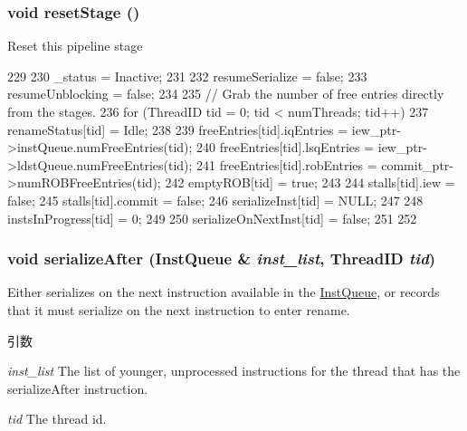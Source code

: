 \hypertarget{classDefaultRename_ada2a699094bc420f977abf2a17ed14c8}{
\subsubsection[{resetStage}]{\setlength{\rightskip}{0pt plus 5cm}void resetStage ()}}
\label{classDefaultRename_ada2a699094bc420f977abf2a17ed14c8}
Reset this pipeline stage 


\begin{DoxyCode}
229 {
230     _status = Inactive;
231 
232     resumeSerialize = false;
233     resumeUnblocking = false;
234 
235     // Grab the number of free entries directly from the stages.
236     for (ThreadID tid = 0; tid < numThreads; tid++) {
237         renameStatus[tid] = Idle;
238 
239         freeEntries[tid].iqEntries = iew_ptr->instQueue.numFreeEntries(tid);
240         freeEntries[tid].lsqEntries = iew_ptr->ldstQueue.numFreeEntries(tid);
241         freeEntries[tid].robEntries = commit_ptr->numROBFreeEntries(tid);
242         emptyROB[tid] = true;
243 
244         stalls[tid].iew = false;
245         stalls[tid].commit = false;
246         serializeInst[tid] = NULL;
247 
248         instsInProgress[tid] = 0;
249 
250         serializeOnNextInst[tid] = false;
251     }
252 }
\end{DoxyCode}
\hypertarget{classDefaultRename_a4010b268c107b9aa7289a98f67171e08}{
\subsubsection[{serializeAfter}]{\setlength{\rightskip}{0pt plus 5cm}void serializeAfter ({\bf InstQueue} \& {\em inst\_\-list}, \/  {\bf ThreadID} {\em tid})}}
\label{classDefaultRename_a4010b268c107b9aa7289a98f67171e08}
Either serializes on the next instruction available in the \hyperlink{classInstQueue}{InstQueue}, or records that it must serialize on the next instruction to enter rename. 
\begin{DoxyParams}{引数}
\item[{\em inst\_\-list}]The list of younger, unprocessed instructions for the thread that has the serializeAfter instruction. \item[{\em tid}]The thread id. \end{DoxyParams}



